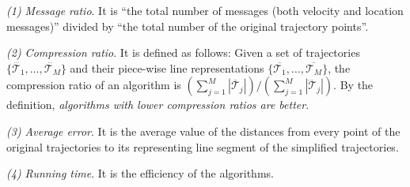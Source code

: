  \ni \emph{(1) Message ratio}. It is ``the total number of messages (both velocity and location messages)'' divided by ``the total number of the original trajectory points''.
 
 \ni \emph{(2) Compression ratio}. It is defined as follows: Given a set of trajectories $\{\dddot{\mathcal{T}_1}, \ldots, \dddot{\mathcal{T}_M}\}$ and their piece-wise line representations $\{\overline{\mathcal{T}_1}, \ldots, \overline{\mathcal{T}_M}\}$, the compression ratio of an algorithm is $(\sum_{j=1}^{M} |\overline{\mathcal{T}}_j |)/(\sum_{j=1}^{M} |\dddot{\mathcal{T}}_j |)$.
 By the definition, \emph{algorithms with lower compression ratios are better}.
 
 \ni \emph{(3) Average error}. It is the average value of the distances from every point of the original trajectories to its representing line segment of the simplified trajectories.
 
 \ni \emph{(4) Running time}. It is the efficiency of the algorithms.
 
